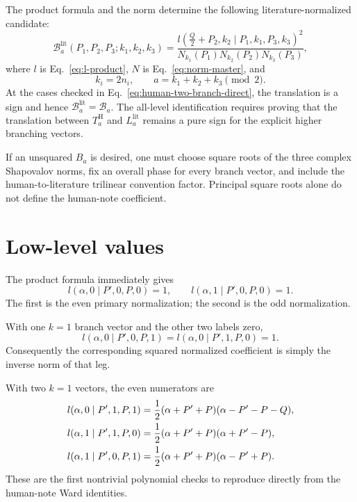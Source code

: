 \documentclass[11pt]{article}
\begin{document}
The product formula and the norm determine the following
literature-normalized candidate:
\begin{equation}
 \boxed{
 \mathcal B_a^{\mathrm{lit}}
 (P_1,P_2,P_3;k_1,k_2,k_3)
 =\frac{
 l\left(\frac Q2+P_2,k_2\mid P_1,k_1,P_3,k_3\right)^2
 }{
 N_{k_1}(P_1)N_{k_2}(P_2)N_{k_3}(P_3)
 },}
 \label{eq:B-final}
\end{equation}
where \(l\) is Eq.~\eqref{eq:l-product}, \(N\) is
Eq.~\eqref{eq:norm-master}, and
\begin{equation}
 k_i=2n_i,
 \qquad
 a=k_1+k_2+k_3\pmod2.
 \label{eq:final-dictionary}
\end{equation}
At the cases checked in Eq.~\eqref{eq:human-two-branch-direct}, the
translation is a sign and hence
\(\mathcal B_a^{\mathrm{lit}}=\mathcal B_a\).  The all-level identification
requires proving that the translation between \(T_a^{\mathrm H}\) and
\(L_a^{\mathrm{lit}}\) remains a pure sign for the explicit higher branching
vectors.

If an unsquared \(B_a\) is desired, one must choose square roots of the three
complex Shapovalov norms, fix an overall phase for every branch vector, and
include the human-to-literature trilinear convention factor.  Principal
square roots alone do not define the human-note coefficient.

\section{Low-level values}

The product formula immediately gives
\begin{equation}
 l(\alpha,0\mid P',0,P,0)=1,
 \qquad
 l(\alpha,1\mid P',0,P,0)=1.
 \label{eq:base-l}
\end{equation}
The first is the even primary normalization; the second is the odd
normalization.

With one \(k=1\) branch vector and the other two labels zero,
\begin{equation}
 l(\alpha,0\mid P',0,P,1)
 =l(\alpha,0\mid P',1,P,0)=1.
 \label{eq:one-branch-l}
\end{equation}
Consequently the corresponding squared normalized coefficient is simply the
inverse norm of that leg.

With two \(k=1\) vectors, the even numerators are
\begin{align}
 l(\alpha,0\mid P',1,P,1)
 &=\frac12(\alpha+P'+P)(\alpha-P'-P-Q),
 \notag\\
 l(\alpha,1\mid P',1,P,0)
 &=\frac12(\alpha+P'+P)(\alpha+P'-P),
 \notag\\
 l(\alpha,1\mid P',0,P,1)
 &=\frac12(\alpha+P'+P)(\alpha-P'+P).
 \label{eq:two-branch-l}
\end{align}
These are the first nontrivial polynomial checks to reproduce directly from
the human-note Ward identities.
\end{document}
